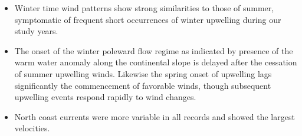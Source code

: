 \begin{itemize}
  \item   Winter time wind patterns show strong similarities to those of
summer, symptomatic of frequent short occurrences of winter
upwelling during our study years.

  \item   The onset of the winter poleward flow regime as indicated by
presence of the warm water anomaly along the continental slope is
delayed after the cessation of summer upwelling winds.  Likewise
the spring onset of upwelling lags significantly the commencement
of favorable winds, though subsequent upwelling events respond
rapidly to wind changes.

  \item   North coast currents were more variable in all records
  and showed the largest velocities.
\end{itemize}
